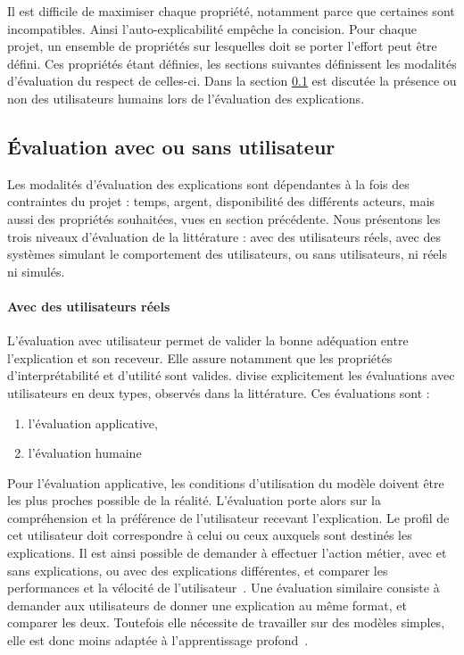 Il est difficile de maximiser chaque propriété, notamment parce que certaines sont incompatibles. Ainsi l'auto-explicabilité empêche la concision. Pour chaque projet, un ensemble de propriétés sur lesquelles doit se porter l'effort peut être défini. Ces propriétés étant définies, les sections suivantes définissent les modalités d'évaluation du respect de celles-ci. Dans la section \ref{C1:utilisateurs} est discutée la présence ou non des utilisateurs humains lors de l'évaluation des explications.

\subsection{\'Evaluation avec ou sans utilisateur} \label{C1:utilisateurs}

Les modalités d'évaluation des explications sont dépendantes à la fois des contraintes du projet : temps, argent, disponibilité des différents acteurs, mais aussi des propriétés souhaitées, vues en section précédente. Nous présentons les trois niveaux d'évaluation de la littérature : avec des utilisateurs réels, avec des systèmes simulant le comportement des utilisateurs, ou sans utilisateurs, ni réels ni simulés.

\paragraph{Avec des utilisateurs réels} \label{C1:utilisateurs_reels} %
L'évaluation avec utilisateur permet de valider la bonne adéquation entre l'explication et son receveur. Elle assure notamment que les propriétés d'interprétabilité et d'utilité sont valides.
\cite{DoshiVelez2017} divise explicitement les évaluations avec utilisateurs en deux types, observés dans la littérature. Ces évaluations sont :
\begin{enumerate}
    \item l'\'evaluation applicative,
    \item l'\'evaluation humaine
\end{enumerate}

Pour l'évaluation applicative, les conditions d'utilisation du modèle doivent être les plus proches possible de la réalité. L'évaluation porte alors sur la compréhension et la préférence de l'utilisateur recevant l'explication. Le profil de cet utilisateur doit correspondre à celui ou ceux auxquels sont destinés les explications. Il est ainsi possible de demander à effectuer l'action métier, avec et sans explications, ou avec des explications différentes, et comparer les performances et la vélocité de l'utilisateur~\cite{Dam2018}. Une évaluation similaire consiste à demander aux utilisateurs de donner une explication au même format, et comparer les deux. Toutefois elle nécessite de travailler sur des modèles simples, elle est donc moins adaptée à l'apprentissage profond~\cite{Lundberg2017, Dam2018}.

